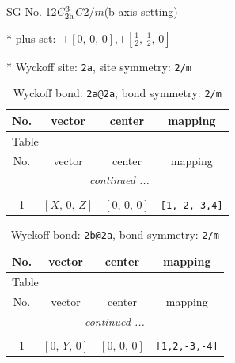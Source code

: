 \documentclass[fleqn,8pt]{jsarticle}
\begin{document}
\setcounter{MaxMatrixCols}{32}

\renewcommand{\tablename}{Table~}
\renewcommand{\figurename}{Figure~}
\begin{center}
\LARGE
SG No. 12\quad$C_{\rm 2h}^{3}$\quad$C2/m$\quad(b-axis setting)\quad[ monoclinic ]
\end{center}

* plus set:\,\,\,$+\left[ 0,\, 0,\, 0 \right]$,\quad $+\left[ \frac{1}{2},\, \frac{1}{2},\, 0 \right]$


* Wyckoff site: {\tt 2a}, site symmetry: {\tt 2/m}
\renewcommand{\arraystretch}{1.2}
\begin{longtable}{cccc}
\caption{Wyckoff bond: {\tt 2a@2a}, bond symmetry: {\tt 2/m}}
 \\
 \hline \hline
No. & vector & center & mapping \\ \hline \endfirsthead

\multicolumn{3}{l}{\tablename\ \thetable{}} \\
 \hline \hline
No. & vector & center & mapping \\ \hline \endhead

 \hline \hline
\multicolumn{3}{r}{\footnotesize\it continued ...} \\ \endfoot

 \hline \hline
\multicolumn{3}{r}{} \\ \endlastfoot

1 & $\left[ X,\, 0,\, Z \right]$ & $\left[ 0,\, 0,\, 0 \right]$ & {\tt [1,-2,-3,4]} \\
\end{longtable}
\renewcommand{\arraystretch}{1.2}
\begin{longtable}{cccc}
\caption{Wyckoff bond: {\tt 2b@2a}, bond symmetry: {\tt 2/m}}
 \\
 \hline \hline
No. & vector & center & mapping \\ \hline \endfirsthead

\multicolumn{3}{l}{\tablename\ \thetable{}} \\
 \hline \hline
No. & vector & center & mapping \\ \hline \endhead

 \hline \hline
\multicolumn{3}{r}{\footnotesize\it continued ...} \\ \endfoot

 \hline \hline
\multicolumn{3}{r}{} \\ \endlastfoot

1 & $\left[ 0,\, Y,\, 0 \right]$ & $\left[ 0,\, 0,\, 0 \right]$ & {\tt [1,2,-3,-4]} \\
\end{longtable}
\end{document}

